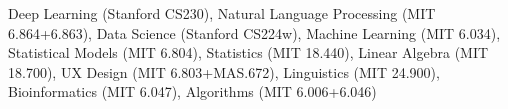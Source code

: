 
Deep Learning (Stanford CS230), Natural Language Processing (MIT 6.864+6.863), Data Science (Stanford CS224w), Machine Learning (MIT 6.034), Statistical Models (MIT 6.804), Statistics (MIT 18.440), Linear Algebra (MIT 18.700), UX Design (MIT 6.803+MAS.672), Linguistics (MIT 24.900), Bioinformatics (MIT 6.047), Algorithms (MIT 6.006+6.046)\\ %